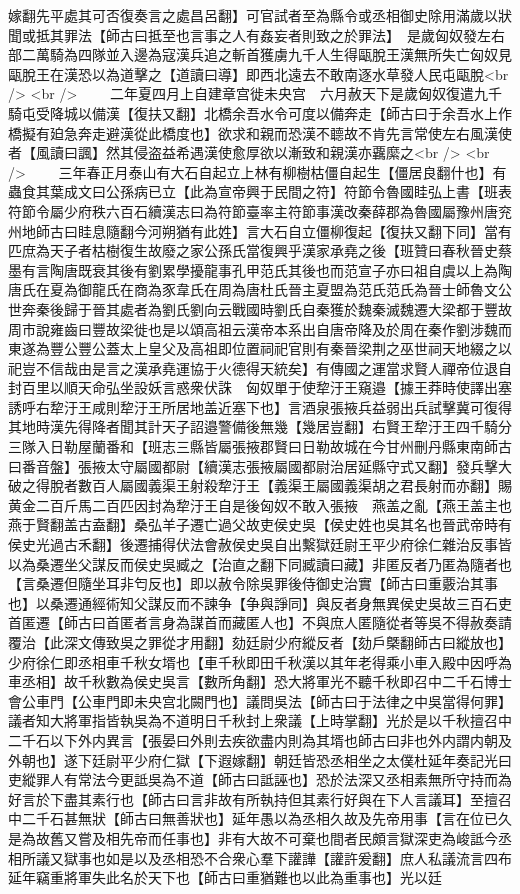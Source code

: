 嫁翻先平處其可否復奏言之處昌呂翻】可官試者至為縣令或丞相御史除用滿歲以狀聞或抵其罪法【師古曰抵至也言事之人有姦妄者則致之於罪法】　是歲匈奴發左右部二萬騎為四隊並入邊為寇漢兵追之斬首獲虜九千人生得甌脫王漢無所失亡匈奴見甌脫王在漢恐以為道擊之【道讀曰導】即西北遠去不敢南逐水草發人民屯甌脫<br />
<br />
　　二年夏四月上自建章宫徙未央宫　六月赦天下是歲匈奴復遣九千騎屯受降城以備漢【復扶又翻】北橋余吾水令可度以備奔走【師古曰于余吾水上作橋擬有廹急奔走避漢從此橋度也】欲求和親而恐漢不聼故不肯先言常使左右風漢使者【風讀曰諷】然其侵盗益希遇漢使愈厚欲以漸致和親漢亦覊縻之<br />
<br />
　　三年春正月泰山有大石自起立上林有柳樹枯僵自起生【僵居良翻什也】有蟲食其葉成文曰公孫病已立【此為宣帝興于民間之符】符節令魯國眭弘上書【班表符節令屬少府秩六百石續漢志曰為符節臺率主符節事漢改秦薛郡為魯國屬豫州唐兖州地師古曰眭息隨翻今河朔猶有此姓】言大石自立僵柳復起【復扶又翻下同】當有匹庶為天子者枯樹復生故廢之家公孫氏當復興乎漢家承堯之後【班贊曰春秋晉史蔡墨有言陶唐既衰其後有劉累學擾龍事孔甲范氏其後也而范宣子亦曰祖自虞以上為陶唐氏在夏為御龍氏在商為豕韋氏在周為唐杜氏晉主夏盟為范氏范氏為晉士師魯文公世奔秦後歸于晉其處者為劉氏劉向云戰國時劉氏自秦獲於魏秦滅魏遷大梁都于豐故周市說雍齒曰豐故梁徙也是以頌高祖云漢帝本系出自唐帝降及於周在秦作劉涉魏而東遂為豐公豐公蓋太上皇父及高祖即位置祠祀官則有秦晉梁荆之巫世祠天地綴之以祀豈不信哉由是言之漢承堯運協于火德得天統矣】有傳國之運當求賢人禪帝位退自封百里以順天命弘坐設妖言惑衆伏誅　匈奴單于使犂汙王窺邉【據王莽時使譯出塞誘呼右犂汙王咸則犂汙王所居地盖近塞下也】言酒泉張掖兵益弱出兵試擊冀可復得其地時漢先得降者聞其計天子詔邉警備後無幾【幾居豈翻】右賢王犂汙王四千騎分三隊入日勒屋蘭番和【班志三縣皆屬張掖郡賢曰日勒故城在今甘州刪丹縣東南師古曰番音盤】張掖太守屬國都尉【續漢志張掖屬國都尉治居延縣守式又翻】發兵擊大破之得脫者數百人屬國義渠王射殺犂汙王【義渠王屬國義渠胡之君長射而亦翻】賜黄金二百斤馬二百匹因封為犂汙王自是後匈奴不敢入張掖　燕盖之亂【燕王盖主也燕于賢翻盖古盍翻】桑弘羊子遷亡過父故吏侯史吳【侯史姓也吳其名也晉武帝時有侯史光過古禾翻】後遷捕得伏法會赦侯史吳自出繫獄廷尉王平少府徐仁雜治反事皆以為桑遷坐父謀反而侯史吳臧之【治直之翻下同臧讀曰藏】非匿反者乃匿為隨者也【言桑遷但隨坐耳非匄反也】即以赦令除吳罪後侍御史治實【師古曰重覈治其事也】以桑遷通經術知父謀反而不諫争【争與諍同】與反者身無異侯史吳故三百石吏首匿遷【師古曰首匿者言身為謀首而藏匿人也】不與庶人匿隨從者等吳不得赦奏請覆治【此深文傳致吳之罪從才用翻】劾廷尉少府縱反者【劾戶槩翻師古曰縱放也】少府徐仁即丞相車千秋女壻也【車千秋即田千秋漢以其年老得乘小車入殿中因呼為車丞相】故千秋數為侯史吳言【數所角翻】恐大將軍光不聽千秋即召中二千石博士會公車門【公車門即未央宫北闕門也】議問吳法【師古曰于法律之中吳當得何罪】議者知大將軍指皆執吳為不道明日千秋封上衆議【上時掌翻】光於是以千秋擅召中二千石以下外内異言【張晏曰外則去疾欲盡内則為其壻也師古曰非也外内謂内朝及外朝也】遂下廷尉平少府仁獄【下遐嫁翻】朝廷皆恐丞相坐之太僕杜延年奏記光曰吏縱罪人有常法今更詆吳為不道【師古曰詆誣也】恐於法深又丞相素無所守持而為好言於下盡其素行也【師古曰言非故有所執持但其素行好與在下人言議耳】至擅召中二千石甚無狀【師古曰無善狀也】延年愚以為丞相久故及先帝用事【言在位已久是為故舊又嘗及相先帝而任事也】非有大故不可棄也間者民頗言獄深吏為峻詆今丞相所議又獄事也如是以及丞相恐不合衆心羣下讙譁【讙許爰翻】庶人私議流言四布延年竊重將軍失此名於天下也【師古曰重猶難也以此為重事也】光以廷